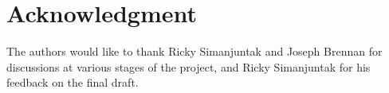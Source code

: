 \documentclass[11pt]{article}
\numberwithin{equation}{section}
\theoremstyle{definition}
\theoremstyle{remark}
\newcommand{\1}{\boldsymbol 1}
\begin{document}








\section{Acknowledgment} 
The authors would like to thank Ricky Simanjuntak and Joseph Brennan for discussions at various stages of the project, and Ricky Simanjuntak for his feedback on the final draft.






% 



\end{document}
